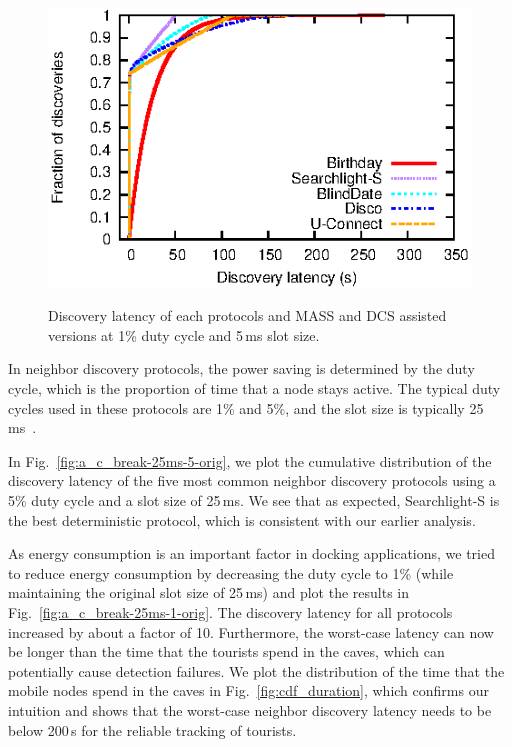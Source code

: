 \documentclass[twoside,twocolumn]{article}
\begin{document}
\begin{figure}[t]
{\begin{minipage}[b]{0.33\textwidth}
           \centering
           \includegraphics[scale=0.85]{graphs/one-month-result/august-5ms-1-syn}
           \label{fig:a_c_break-5ms-1-syn}
        \end{minipage}}
    \caption{Discovery latency of each protocols and MASS and DCS
        assisted versions at 1\% duty cycle and 5\,ms slot size.}
    \label{fig:break-compare}
\end{figure}


In neighbor discovery protocols, the power saving is determined by the
duty cycle, which is the proportion of time that a node stays
active. The typical duty cycles used in these protocols are 1\% and
5\%, and the slot size is typically
25\,ms~\citep{wang13blinddate,sun14hello,bakht2012searchlight}.

In Fig.~\ref{fig:a_c_break-25ms-5-orig}, we plot the cumulative
distribution of the discovery latency of the five most common neighbor
discovery protocols using a 5\% duty cycle and a slot size of
25\,ms. We see that as expected, Searchlight-S is the best
deterministic protocol, which is consistent with our earlier analysis.

As energy consumption is an important factor in docking applications,
we tried to reduce energy consumption by decreasing the duty cycle to
1\% (while maintaining the original slot size of 25\,ms) and plot the
results in Fig.~\ref{fig:a_c_break-25ms-1-orig}.  The discovery
latency for all protocols increased by about a factor of
10. Furthermore, the worst-case latency can now be longer than the
time that the tourists spend in the caves, which can potentially cause
detection failures. We plot the distribution of the time that the
mobile nodes spend in the caves in Fig.~\ref{fig:cdf_duration},
which confirms our intuition and shows that the worst-case neighbor
discovery latency needs to be below 200\,s for the reliable tracking
of tourists.
\end{document}

